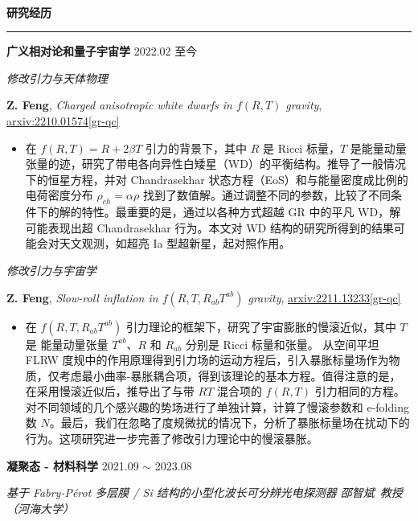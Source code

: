 \documentclass[12pt]{article}
\renewcommand*{\section}[1]{
    ~\\ \noindent \textbf{#1} \medskip \hrule \medskip
}
\begin{document}
\section{研究经历}

\textbf{广义相对论和量子宇宙学} \hfill 2022.02 至今

\smallskip \quad \textit{修改引力与天体物理}

\textbf{Z. Feng}, \textit{Charged anisotropic white dwarfs in $f\left({R}, {T}\right)$ gravity}, \href{https://arxiv.org/abs/2210.01574}{arxiv:2210.01574[gr-qc]}

\begin{itemize}[noitemsep,nolistsep]
    \item 在 $f\left(R, T\right) = R + 2 \beta T$ 引力的背景下，其中 $R$ 是 Ricci 标量，$T$ 是能量动量张量的迹，研究了带电各向异性白矮星（WD）的平衡结构。推导了一般情况下的恒星方程，并对 Chandrasekhar 状态方程（EoS）和与能量密度成比例的电荷密度分布 $\rho_{ch} = \alpha \rho$ 找到了数值解。通过调整不同的参数，比较了不同条件下的解的特性。最重要的是，通过以各种方式超越 GR 中的平凡 WD，解可能表现出超 Chandrasekhar 行为。本文对 WD 结构的研究所得到的结果可能会对天文观测，如超亮 Ia 型超新星，起对照作用。
\end{itemize}

\smallskip \quad \textit{修改引力与宇宙学}

\textbf{Z. Feng}, \textit{Slow-roll inflation in $f\left(R, T, R_{ab}T^{ab}\right)$ gravity}, \href{https://arxiv.org/abs/2211.13233}{arxiv:2211.13233[gr-qc]}

\begin{itemize}[noitemsep,nolistsep]
    \item 在 $f\left(R, T, R_{ab}T^{ab}\right)$ 引力理论的框架下，研究了宇宙膨胀的慢滚近似，其中 $T$ 是 能量动量张量 $T^{ab}$、$R$ 和 $R_{ab}$ 分别是 Ricci 标量和张量。 从空间平坦 FLRW 度规中的作用原理得到引力场的运动方程后，引入暴胀标量场作为物质，仅考虑最小曲率-暴胀耦合项，得到该理论的基本方程。值得注意的是，在采用慢滚近似后，推导出了与带 $RT$ 混合项的 $f(R, T)$ 引力相同的方程。对不同领域的几个感兴趣的势场进行了单独计算，计算了慢滚参数和 e-folding 数 $N$。最后，我们在忽略了度规微扰的情况下，分析了暴胀标量场在扰动下的行为。这项研究进一步完善了修改引力理论中的慢滚暴胀。
\end{itemize}

\medskip \textbf{凝聚态 - 材料科学} \hfill 2021.09 $\sim$ 2023.08

\smallskip \quad \textit{基于 Fabry-P\'{e}rot 多层膜 / Si 结构的小型化波长可分辨光电探测器 \hfill 邵智斌\ 教授（河海大学）}
\end{document}
